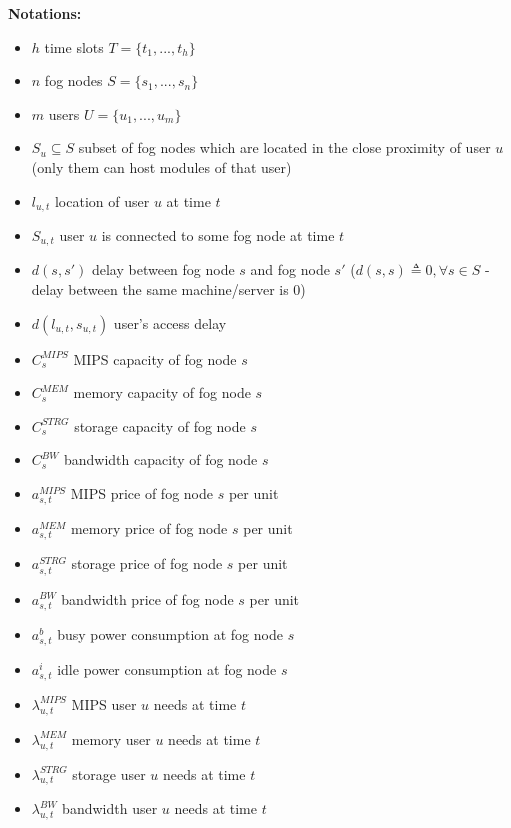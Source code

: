 \documentclass{article}
\begin{document}
\vspace{12pt}
\noindent\textbf{Notations:}\\[6pt]
\begin{itemize}
    \item $h$ time slots $T=\{t_1, ..., t_h\}$
    \item $n$ fog nodes $S=\{s_1, ..., s_n\}$
    \item $m$ users $U=\{u_1, ..., u_m\}$
    \item $S_u \subseteq S$ subset of fog nodes which are located in the close proximity of user $u$ (only them can host modules of that user)\\
    
    \item $l_{u,t}$ location of user $u$ at time $t$
    \item $S_{u,t}$ user $u$ is connected to some fog node at time $t$
    \item $d(s, s')$ delay between fog node $s$ and fog node $s'$ ($d(s, s) \triangleq 0, \forall s \in S$ - delay between the same machine/server is 0)
    \item $d(l_{u,t}, s_{u,t})$ user's access delay\\
    
    \item $C^{MIPS}_{s}$ MIPS capacity of fog node $s$
    \item $C^{MEM}_{s}$ memory capacity of fog node $s$
    \item $C^{STRG}_{s}$ storage capacity of fog node $s$
    \item $C^{BW}_{s}$ bandwidth capacity of fog node $s$\\
    
    \item $a^{MIPS}_{s,t}$ MIPS price of fog node $s$ per unit
    \item $a^{MEM}_{s,t}$ memory price of fog node $s$ per unit
    \item $a^{STRG}_{s,t}$ storage price of fog node $s$ per unit
    \item $a^{BW}_{s,t}$ bandwidth price of fog node $s$ per unit
    \item $a^b_{s,t}$ busy power consumption at fog node $s$
    \item $a^i_{s,t}$ idle power consumption at fog node $s$\\
    
    \item $\lambda^{MIPS}_{u,t}$ MIPS user $u$ needs at time $t$
    \item $\lambda^{MEM}_{u,t}$ memory user $u$ needs at time $t$
    \item $\lambda^{STRG}_{u,t}$ storage user $u$ needs at time $t$
    \item $\lambda^{BW}_{u,t}$ bandwidth user $u$ needs at time $t$\\
    

\end{itemize}
\end{document}
